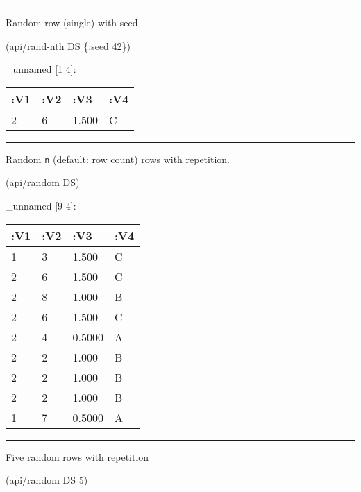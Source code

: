 \documentclass[]{article}
\newenvironment{Shaded}{\begin{snugshade}}{\end{snugshade}}
\newcommand{\DecValTok}[1]{\textcolor[rgb]{0.00,0.00,0.81}{#1}}
\newcommand{\AttributeTok}[1]{\textcolor[rgb]{0.77,0.63,0.00}{#1}}
\newcommand{\NormalTok}[1]{#1}
\begin{document}
\begin{center}\rule{0.5\linewidth}{0.5pt}\end{center}

Random row (single) with seed

\begin{Shaded}
\begin{Highlighting}[]
\NormalTok{(api/rand-nth DS \{}\AttributeTok{:seed} \DecValTok{42}\NormalTok{\})}
\end{Highlighting}
\end{Shaded}

\_unnamed {[}1 4{]}:

\begin{longtable}[]{@{}llll@{}}
\toprule
:V1 & :V2 & :V3 & :V4\tabularnewline
\midrule
\endhead
2 & 6 & 1.500 & C\tabularnewline
\bottomrule
\end{longtable}

\begin{center}\rule{0.5\linewidth}{0.5pt}\end{center}

Random \texttt{n} (default: row count) rows with repetition.

\begin{Shaded}
\begin{Highlighting}[]
\NormalTok{(api/random DS)}
\end{Highlighting}
\end{Shaded}

\_unnamed {[}9 4{]}:

\begin{longtable}[]{@{}llll@{}}
\toprule
:V1 & :V2 & :V3 & :V4\tabularnewline
\midrule
\endhead
1 & 3 & 1.500 & C\tabularnewline
2 & 6 & 1.500 & C\tabularnewline
2 & 8 & 1.000 & B\tabularnewline
2 & 6 & 1.500 & C\tabularnewline
2 & 4 & 0.5000 & A\tabularnewline
2 & 2 & 1.000 & B\tabularnewline
2 & 2 & 1.000 & B\tabularnewline
2 & 2 & 1.000 & B\tabularnewline
1 & 7 & 0.5000 & A\tabularnewline
\bottomrule
\end{longtable}

\begin{center}\rule{0.5\linewidth}{0.5pt}\end{center}

Five random rows with repetition

\begin{Shaded}
\begin{Highlighting}[]
\NormalTok{(api/random DS }\DecValTok{5}\NormalTok{)}
\end{Highlighting}
\end{Shaded}
\end{document}
